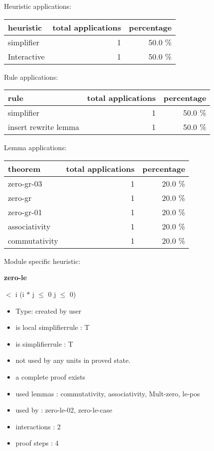 \documentclass[a4paper]{article}
\begin{document}
\medskip


Heuristic applications:

\begin{supertabular}{l|r|r}
heuristic	& total applications & percentage \\ \hline
simplifier & 1 & 50.0 \% \\
Interactive & 1 & 50.0 \% \\

\end{supertabular}

Rule applications:

\begin{supertabular}{l|r|r}
rule	        & total applications & percentage \\ \hline
simplifier & 1 & 50.0 \% \\
insert rewrite lemma & 1 & 50.0 \% \\

\end{supertabular}

Lemma applications:

\begin{supertabular}{l|r|r}
theorem	        & total applications & percentage \\ \hline
zero-gr-03 & 1 & 20.0 \% \\
zero-gr & 1 & 20.0 \% \\
zero-gr-01 & 1 & 20.0 \% \\
associativity & 1 & 20.0 \% \\
commutativity & 1 & 20.0 \% \\

\end{supertabular}

Module specific heuristic:

\pagebreak

{\LARGE\bf zero-le}\label{lemma-zero-le}

\medskip

  $<$ i \Imp (i $*$ j $\le$ 0 \Equiv j $\le$ 0)

\begin{itemize}

\item Type: created by user

\item is local simplifierrule : T
\item is simplifierrule : T
\item not used by any units in proved state.
\item       a complete proof exists
\item       used lemmas  : commutativity, associativity, Mult-zero, le-pos
\item       used by      : zero-le-02, zero-le-case
\item       interactions : 2
\item       proof steps  : 4
\end{itemize}
\end{document}

